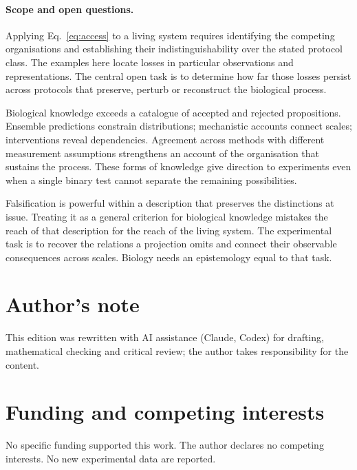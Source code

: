 \documentclass[10pt,twocolumn]{article}
\begin{document}
\paragraph{Scope and open questions.}
Applying Eq.~\eqref{eq:access} to a living system requires identifying the competing organisations and establishing their indistinguishability over the stated protocol class. The examples here locate losses in particular observations and representations. The central open task is to determine how far those losses persist across protocols that preserve, perturb or reconstruct the biological process.

Biological knowledge exceeds a catalogue of accepted and rejected propositions. Ensemble predictions constrain distributions; mechanistic accounts connect scales; interventions reveal dependencies. Agreement across methods with different measurement assumptions strengthens an account of the organisation that sustains the process. These forms of knowledge give direction to experiments even when a single binary test cannot separate the remaining possibilities.

Falsification is powerful within a description that preserves the distinctions at issue. Treating it as a general criterion for biological knowledge mistakes the reach of that description for the reach of the living system. The experimental task is to recover the relations a projection omits and connect their observable consequences across scales. Biology needs an epistemology equal to that task.

\section*{Author's note}
This edition was rewritten with AI assistance (Claude, Codex) for drafting, mathematical checking and critical review; the author takes responsibility for the content.

\section*{Funding and competing interests}
No specific funding supported this work. The author declares no competing interests. No new experimental data are reported.

{\small
\renewcommand{\bibfont}{\small\raggedright}


}
\end{document}

